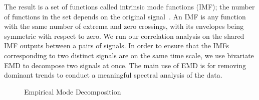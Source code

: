 The result is a set of functions called intrinsic mode functions (IMF); the number of functions in 
the set depends on the original signal~\cite{emd_process}.  An IMF is any 
function with the same number of extrema and zero crossings, with its envelopes being symmetric with respect to zero.
We run our correlation analysis on the shared IMF outputs between a pairs of signals.  In order to ensure 
that the IMFs corresponding to two distinct signals are on the same time scale, we use 
bivariate EMD \cite{rilling:biemd2007} to decompose two signals at once. The main use of EMD is for removing dominant trends to conduct a meaningful spectral analysis of the data.

\begin{figure}
 \caption{Empirical Mode Decomposition}
 \label{fig:emd}
\end{figure}
